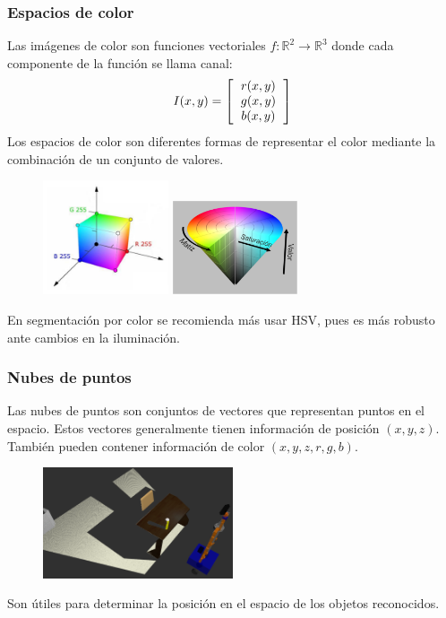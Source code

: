 \begin{frame}\frametitle{Espacios de color}
  Las imágenes de color son funciones vectoriales $f:\mathbb{R}^2\rightarrow \mathbb{R}^3$ donde cada componente de la función se llama canal:
  \[I(x,y) = \left[\begin{tabular}{c}$r(x,y)$\\$g(x,y)$\\$b(x,y)$\end{tabular}\right]\]  
  Los espacios de color son diferentes formas de representar el color mediante la combinación de un conjunto de valores. 
  \begin{figure}
    \centering
    \includegraphics[width=0.33\textwidth]{Figures/RGB_model.pdf}
    \includegraphics[width=0.33\textwidth]{Figures/hsv_space.pdf}
  \end{figure}
  En segmentación por color se recomienda más usar HSV, pues es más robusto ante cambios en la iluminación.
\end{frame}

\begin{frame}\frametitle{Nubes de puntos}
  Las nubes de puntos son conjuntos de vectores que representan puntos en el espacio. Estos vectores generalmente tienen información de posición $(x,y,z)$. También pueden contener información de color $(x,y,z,r,g,b)$.
  \begin{figure}
      \centering
      \includegraphics[width=0.5\textwidth]{Figures/CloudExample.png}
  \end{figure}
  Son útiles para determinar la posición en el espacio de los objetos reconocidos. 
\end{frame}

